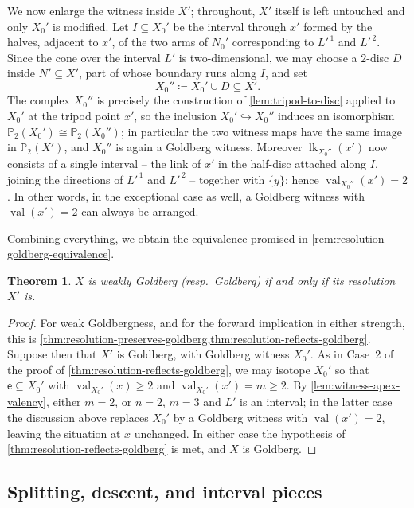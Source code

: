 \documentclass[reqno]{amsart}
\newtheorem{theorem}{Theorem}[section]
\theoremstyle{definition}
\newcommand\sfe{\mathsf{e}}
\newcommand{\PB}{\mathbb{P}}
\DeclareMathOperator{\lk}{lk}
\DeclareMathOperator{\val}{val}
\numberwithin{equation}{section}
\begin{document}
We now enlarge the witness inside \(X'\); throughout, \(X'\)
itself is left untouched and only \(X_0'\) is modified. Let
\(I\subseteq X_0'\) be the interval through \(x'\) formed by the
halves, adjacent to \(x'\), of the two arms of \(N_0'\)
corresponding to \(L'^{\,1}\) and \(L'^{\,2}\). Since the cone
over the interval \(L'\) is two-dimensional, we may choose a
\(2\)-disc \(D\) inside \(N'\subseteq X'\), part of whose boundary
runs along \(I\), and set
\[
X_0''\coloneqq X_0'\cup D\subseteq X'.
\]
The complex \(X_0''\) is precisely the construction of
\cref{lem:tripod-to-disc} applied to \(X_0'\) at the tripod point
\(x'\), so the inclusion \(X_0'\hookrightarrow X_0''\) induces an
isomorphism \(\PB_2(X_0')\cong\PB_2(X_0'')\); in particular the
two witness maps have the same image in \(\PB_2(X')\), and
\(X_0''\) is again a Goldberg witness. Moreover \(\lk_{X_0''}(x')\) now
consists of a single interval -- the link of \(x'\) in the
half-disc attached along \(I\), joining the directions of
\(L'^{\,1}\) and \(L'^{\,2}\) -- together with \(\{y\}\); hence
\(\val_{X_0''}(x')=2\). In other words, in the exceptional case as
well, a Goldberg witness with \(\val(x')=2\) can always be
arranged.

Combining everything, we obtain the equivalence promised in
\cref{rem:resolution-goldberg-equivalence}.

\begin{theorem}\label{thm:resolution-goldberg-equivalence}
\(X\) is weakly Goldberg (resp.\ Goldberg) if and only if its
resolution \(X'\) is.
\end{theorem}

\begin{proof}
For weak Goldbergness, and for the forward implication in either
strength, this is
\cref{thm:resolution-preserves-goldberg,thm:resolution-reflects-goldberg}.
Suppose then that \(X'\) is Goldberg, with Goldberg witness
\(X_0'\). As in Case~2 of the proof of
\cref{thm:resolution-reflects-goldberg}, we may isotope \(X_0'\)
so that \(\sfe\subseteq X_0'\) with \(\val_{X_0'}(x)\geq2\) and
\(\val_{X_0'}(x')=m\geq2\). By \cref{lem:witness-apex-valency},
either \(m=2\), or \(n=2\), \(m=3\) and \(L'\) is an interval; in
the latter case the discussion above replaces \(X_0'\) by a
Goldberg witness with \(\val(x')=2\), leaving the situation at
\(x\) unchanged. In either case the hypothesis of
\cref{thm:resolution-reflects-goldberg} is met, and \(X\) is
Goldberg.
\end{proof}


\subsection{Splitting, descent, and interval pieces}
\label{ssec:witness-splitting-descent}
\end{document}
